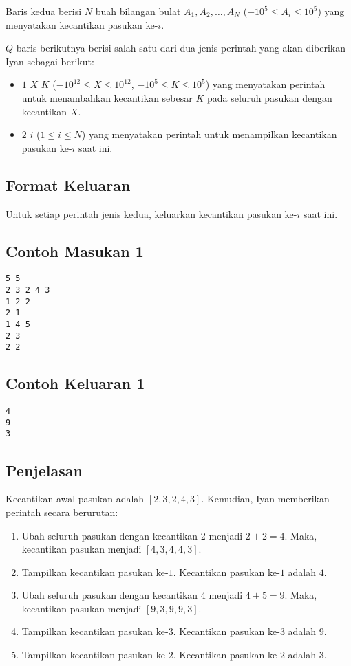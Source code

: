 \documentclass{article}
\begin{document}
Baris kedua berisi $N$ buah bilangan bulat $A_1, A_2, \dots, A_N$ ($-10^5 \leq A_i \leq 10^5$) yang menyatakan kecantikan pasukan ke-$i$.

$Q$ baris berikutnya berisi salah satu dari dua jenis perintah yang akan diberikan Iyan sebagai berikut:
\begin{itemize}
    \item $1$ $X$ $K$ ($-10^{12} \leq X \leq 10^{12}$, $-10^5 \leq K \leq 10^5$) yang menyatakan perintah untuk menambahkan kecantikan sebesar $K$ pada seluruh pasukan dengan kecantikan $X$.
    \item $2$ $i$ ($1 \leq i \leq N$) yang menyatakan perintah untuk menampilkan kecantikan pasukan ke-$i$ saat ini.
\end{itemize}

\subsection*{Format Keluaran}

Untuk setiap perintah jenis kedua, keluarkan kecantikan pasukan ke-$i$ saat ini.
\\
\pagebreak
\begin{multicols}{2}
\subsection*{Contoh Masukan 1}
\begin{lstlisting}
5 5  
2 3 2 4 3  
1 2 2  
2 1  
1 4 5  
2 3  
2 2  
\end{lstlisting}
\columnbreak
\subsection*{Contoh Keluaran 1}
\begin{lstlisting}
4
9
3
\end{lstlisting}
\vfill
\null
\end{multicols}


\subsection*{Penjelasan}

Kecantikan awal pasukan adalah $[2, 3, 2, 4, 3]$. Kemudian, Iyan memberikan perintah secara berurutan:
\begin{enumerate}
    \item Ubah seluruh pasukan dengan kecantikan $2$ menjadi $2+2=4$. Maka, kecantikan pasukan menjadi $[4, 3, 4, 4, 3]$.
    \item Tampilkan kecantikan pasukan ke-$1$. Kecantikan pasukan ke-$1$ adalah $4$.
    \item Ubah seluruh pasukan dengan kecantikan $4$ menjadi $4+5=9$. Maka, kecantikan pasukan menjadi $[9, 3, 9, 9, 3]$.
    \item Tampilkan kecantikan pasukan ke-$3$. Kecantikan pasukan ke-$3$ adalah $9$.
    \item Tampilkan kecantikan pasukan ke-$2$. Kecantikan pasukan ke-$2$ adalah $3$.
\end{enumerate}

%
%
\end{document}
